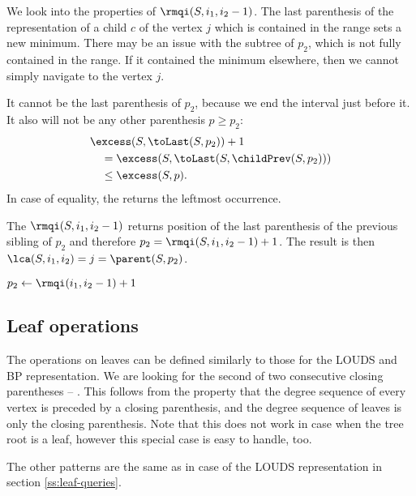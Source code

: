 We look into the properties of $\rmqi(S, i_1, i_2 - 1)$.
The last parenthesis of the representation of a child $c$ of the vertex $j$ which is contained in the range sets a new minimum.
There may be an issue with the subtree of $p_2$, which is not fully contained in the range.
If it contained the minimum elsewhere, then we cannot simply navigate to the vertex $j$.

It cannot be the last parenthesis of $p_2$, because we end the interval just before it.
It also will not be any other parenthesis $p \ge p_2$:
\begin{align*}
	& \excess(S, \toLast(S, p_2)) + 1 \\
	&\quad = \excess(S, \toLast(S, \childPrev(S, p_2))) \\
	&\quad \le \excess(S, p).
\end{align*}
In case of equality, the \rmqi{} returns the leftmost occurrence.

The $\rmqi(S, i_1, i_2 - 1)$ returns position of the last parenthesis of the previous sibling of $p_2$ and therefore $p_2 = \rmqi(S, i_1, i_2 - 1) + 1$.
The result is then $\lca(S, i_1, i_2) = j = \parent(S, p_2)$.

\begin{algorithm}
\begin{algorithmic}
		\State {}
		\State {}
	\Else
		\State $p_2 \gets \rmqi(i_1, i_2 - 1) + 1$
		\State {}
	\EndIf
\EndFunction
\end{algorithmic}
\end{algorithm}

\subsection{Leaf operations}

The operations on leaves can be defined similarly to those for the LOUDS and BP representation.
We are looking for the second of two consecutive closing parentheses -- \str{))}.
This follows from the property that the degree sequence of every vertex is preceded by a closing parenthesis, and the degree sequence of leaves is only the closing parenthesis.
Note that this does not work in case when the tree root is a leaf, however this special case is easy to handle, too.

The other patterns are the same as in case of the LOUDS representation in section \ref{ss:leaf-queries}.

